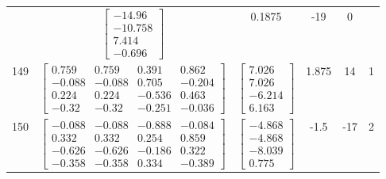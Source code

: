 \documentclass[a4paper,12pt]{article}
\begin{document}
\begin{tabular}{c c c c c c}
&
$\begin{bmatrix} -14.96 \\ -10.758 \\ 7.414 \\ -0.696 \end{bmatrix}$
&
0.1875
&
-19
&
0
\\
149
&
$\begin{bmatrix} 0.759 & 0.759 & 0.391 & 0.862 \\ -0.088 & -0.088 & 0.705 & -0.204 \\ 0.224 & 0.224 & -0.536 & 0.463 \\ -0.32 & -0.32 & -0.251 & -0.036 \end{bmatrix}$
&
$\begin{bmatrix} 7.026 \\ 7.026 \\ -6.214 \\ 6.163 \end{bmatrix}$
&
1.875
&
14
&
1
\\
150
&
$\begin{bmatrix} -0.088 & -0.088 & -0.888 & -0.084 \\ 0.332 & 0.332 & 0.254 & 0.859 \\ -0.626 & -0.626 & -0.186 & 0.322 \\ -0.358 & -0.358 & 0.334 & -0.389 \end{bmatrix}$
&
$\begin{bmatrix} -4.868 \\ -4.868 \\ -8.039 \\ 0.775 \end{bmatrix}$
&
-1.5
&
-17
&
2
\\
\end{tabular} \egroup \newpage
\end{document}
